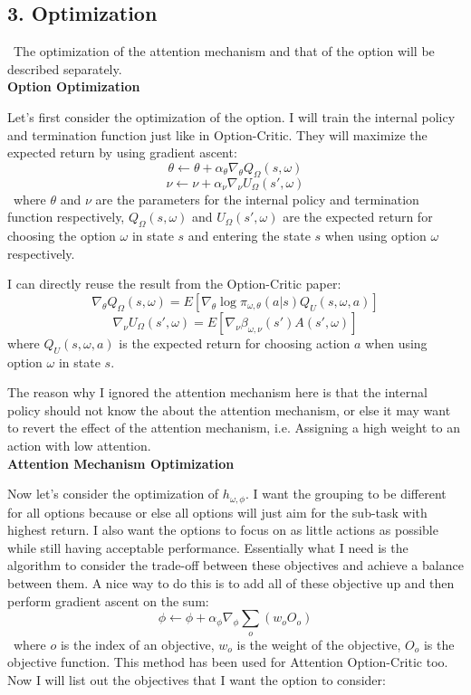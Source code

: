 \documentclass{article}
\begin{document}
	\subsection*{3. Optimization}
	\qquad \ The optimization of the attention mechanism and that of the option will be described separately.\vspace{0.2in}\\
	{\bfseries Option Optimization}\vspace{0.05in}
	
	\quad Let's first consider the optimization of the option. I will train the internal policy and termination function just like in Option-Critic. They will maximize the expected return by using gradient ascent:
	$$\theta \leftarrow \theta + \alpha_\theta \nabla_\theta Q_\Omega(s,\omega)$$
	$$\nu \leftarrow \nu + \alpha_\nu \nabla_\nu U_\Omega(s',\omega)$$
	\qquad \ where $\theta$ and $\nu$ are the parameters for the internal policy and termination function respectively, $Q_\Omega(s,\omega)$ and $U_\Omega(s',\omega)$ are the expected return for choosing the option $\omega$ in state $s$ and entering the state $s$ when using option $\omega$ respectively.
	
	\quad I can directly reuse the result from the Option-Critic paper\cite{bacon2016optioncritic}:
	$$\nabla_\theta Q_\Omega(s,\omega) = E[\nabla_\theta \log \pi_{\omega, \theta}(a|s) Q_U(s,\omega,a)]$$
	$$\nabla_\nu U_\Omega(s',\omega) = E[\nabla_\nu \beta_{\omega, \nu}(s') A(s',\omega)]$$
	\qquad where $Q_U(s,\omega,a)$ is the expected return for choosing action $a$ when using option $\omega$ in state $s$.
	
	\quad The reason why I ignored the attention mechanism here is that the internal policy should not know the about the attention mechanism, or else it may want to revert the effect of the attention mechanism, i.e. Assigning a high weight to an action with low attention.\vspace{0.2in}\\
	{\bfseries Attention Mechanism Optimization}\vspace{0.05in}
	
	\quad Now let's consider the optimization of $h_{\omega,\phi}$. I want the grouping to be different for all options because or else all options will just aim for the sub-task with highest return. I also want the options to focus on as little actions as possible while still having acceptable performance. Essentially what I need is the algorithm to consider the trade-off between these objectives and achieve a balance between them. A nice way to do this is to add all of these objective up and then perform gradient ascent on the sum: $$\phi \leftarrow \phi + \alpha_\phi \nabla_\phi \sum_{o} (w_o O_o)$$ \qquad \ where $o$ is the index of an objective, $w_o$ is the weight of the objective, $O_o$ is the objective function.
	\quad This method has been used for Attention Option-Critic too. Now I will list out the objectives that I want the option to consider: 
	
\end{document}
